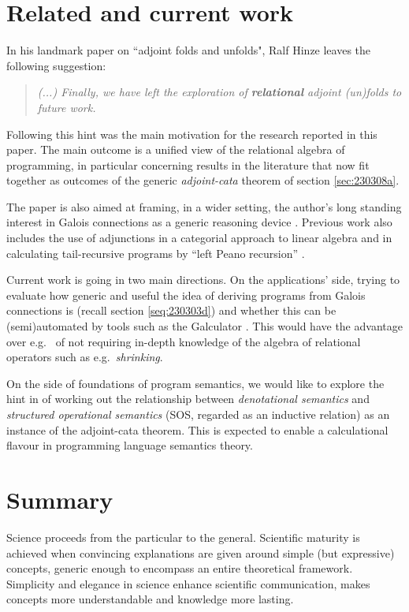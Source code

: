 \documentclass{elsarticle}
\begin{document}
\section{Related and current work}
In his landmark paper \cite{Hi13} on ``adjoint folds and unfolds", Ralf Hinze leaves the following suggestion:
\begin{quote}\em
(...) Finally, we have left the exploration of \textbf{relational} adjoint (un)folds to future work.
\end{quote}
Following this hint was the main motivation for the research reported in this paper.
The main outcome is a unified view of the relational algebra of programming,
in particular concerning results in the literature \cite{BM97} that now fit together as outcomes of the 
generic \emph{adjoint-cata} theorem of section \ref{sec:230308a}.

The paper is also aimed at framing, in a wider setting, 
the author's long standing interest in Galois connections as
a generic reasoning device \cite{SO08,MO11,Ol19}.
Previous work also includes the use of adjunctions in a categorial approach
to linear algebra \cite{MO13c} and in calculating tail-recursive programs
by ``left Peano recursion'' \cite{Ol20,Da23}.

Current work is going in two main directions. On the applications' side, trying to evaluate how
generic and useful the idea of deriving programs from Galois connections is
(recall section \ref{seq:230303d}) and whether this can be (semi)automated by tools
such as the Galculator \cite{SO08}. This would have the advantage over e.g.\ \cite{MO11}
of not requiring in-depth knowledge of the algebra of relational operators such as
e.g.\ \emph{shrinking}.

On the side of foundations of program semantics, we would like to explore the hint in \cite{Ol21}
of working out the relationship between \emph{denotational semantics} and \emph{structured operational semantics} (SOS, regarded as an inductive relation) \cite{Wi93} as an instance of the adjoint-cata theorem. This is expected to enable a calculational flavour in programming language semantics theory.

\section{Summary}

Science proceeds from the particular to the general. Scientific maturity
is achieved when convincing explanations are given around simple (but expressive)
concepts, generic enough to encompass an entire theoretical framework.
Simplicity and elegance in science enhance scientific communication, makes
concepts more understandable and knowledge more lasting.
\end{document}
